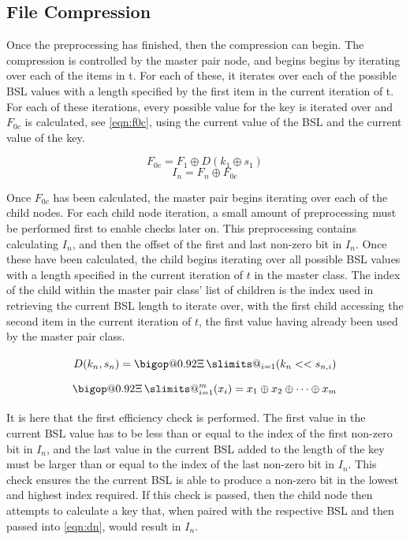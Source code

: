 \documentclass{hehe}
\makeatletter
\DeclareRobustCommand\bigop[2][1]{%
  \mathop{\vphantom{\sum}\mathpalette\bigop@{{#1}{#2}}}\slimits@
}
\newcommand{\bigop@}[2]{\bigop@@#1#2}
\newcommand{\bigop@@}[3]{%
  \vcenter{%
    \sbox\z@{$#1\sum$}%
    \hbox{\resizebox{\ifx#1\displaystyle#2\fi\dimexpr\ht\z@+\dp\z@}{!}{$\m@th#3$}}%
  }%
}
\newcommand{\XORsum}{\DOTSB\bigop[0.92]{\Xi}}
\makeatother
\begin{document}
\subsection{File Compression}

Once the preprocessing has finished, then the compression can begin. The compression is controlled by the master pair node, and begins begins by iterating over each of the items in t. For each of these, it iterates over each of the possible BSL values with a length specified by the first item in the current iteration of t. For each of these iterations, every possible value for the key is iterated over and $F_{0c}$ is calculated, see \cref{eqn:f0c}, using the current value of the BSL and the current value of the key.

\begin{equation}\label{eqn:f0c}
  F_{0c}=F_1 \oplus D(k_1\oplus s_1)
\end{equation}
\begin{equation}\label{eqn:in}
  I_n=F_n\oplus F_{0c}
\end{equation}

Once $F_{0c}$ has been calculated, the master pair begins iterating over each of the child nodes. For each child node iteration, a small amount of preprocessing must be performed first to enable checks later on. This preprocessing contains calculating $I_n$, and then the offset of the first and last non-zero bit in $I_n$. Once these have been calculated, the child begins iterating over all possible BSL values with a length specified in the current iteration of $t$ in the master class. The index of the child within the master pair class' list of children is the index used in retrieving the current BSL length to iterate over, with the first child accessing the second item in the current iteration of $t$, the first value having already been used by the master pair class.

\begin{equation}\label{eqn:dn}
  D(k_n,s_n)=\XORsum_{i=1}(k_n << s_{n,i})
\end{equation}
\begin{equation}\label{eqn:xorSumExplain}
  \XORsum_{i=1}^m(x_i)=x_1\oplus x_2\oplus \dots \oplus x_m
\end{equation}

It is here that the first efficiency check is performed. The first value in the current BSL value has to be less than or equal to the index of the first non-zero bit in $I_n$, and the last value in the current BSL added to the length of the key must be larger than or equal to the index of the last non-zero bit in $I_n$. This check ensures the the current BSL is able to produce a non-zero bit in the lowest and highest index required. If this check is passed, then the child node then attempts to calculate a key that, when paired with the respective BSL and then passed into \cref{eqn:dn}, would result in $I_n$.
\end{document}
